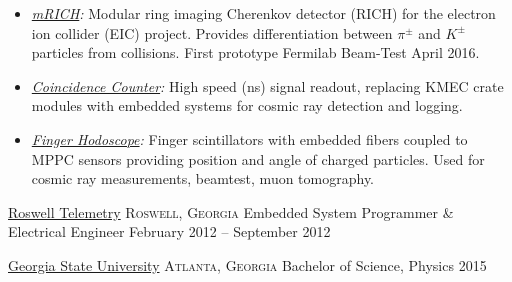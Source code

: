 \documentclass[10pt,letterpaper]{article}
\begin{document}
{{\begin{itemize}
      \item \emph{\href{https://github.com/Sawaiz/modularRICH}{mRICH}:}
        Modular ring imaging Cherenkov detector (RICH) for the electron ion collider (EIC) project. Provides differentiation between $\pi^\pm$ and $K^\pm$ particles from collisions. First prototype Fermilab Beam-Test April 2016.
      \item \emph{\href{https://github.com/Sawaiz/coincidenceCounter}{Coincidence Counter}:}
        High speed (ns) signal readout, replacing KMEC crate modules with embedded systems for cosmic ray detection and logging.
      \item \emph{\href{https://github.com/Sawaiz/modularHodoscope}{Finger Hodoscope}:}
        Finger scintillators with embedded fibers coupled to MPPC sensors providing position and angle of charged particles. Used for cosmic ray measurements, beamtest, muon tomography.
    \end{itemize}
    }
}

\headedsection
  {\href{http://web.archive.org/web/20111024221117/http://www.roswelltelemetry.com/}{Roswell Telemetry}}
  {\textsc{Roswell, Georgia}} {%
  \headedsubsection
    {Embedded System Programmer \& Electrical Engineer}
    {February 2012 -- September 2012}
    {}
}

\spacedhrule{0.2em}{-0.4em}


\headedsection
  {\href{http://www.gsu.edu}{Georgia State University}}
  {\textsc{Atlanta, Georgia}} {%
  \headedsubsection
    {Bachelor of Science, Physics}
    {2015}
    {}
}

\spacedhrule{0.5em}{-0.4em}

\end{document}

